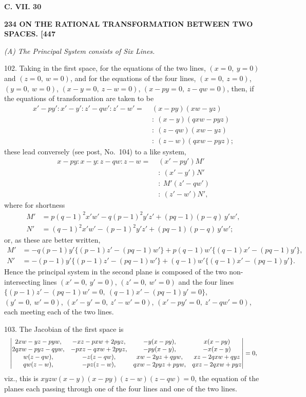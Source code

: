 \documentclass[11pt]{article}
\begin{document}
\medskip
\noindent\textbf{C. VII. \hfill 30}

\medskip
\noindent\textbf{234 \hfill ON THE RATIONAL TRANSFORMATION BETWEEN TWO SPACES. \hfill [447}

\medskip
\begin{center}\textit{(A) The Principal System consists of Six Lines.}\end{center}

102. Taking in the first space, for the equations of the two lines, $(x=0,\ y=0)$ and
$(z=0,\ w=0)$, and for the equations of the four lines, $(x=0,\ z=0)$, $(y=0,\ w=0)$,
$(x-y=0,\ z-w=0)$, $(x-py=0,\ z-qw=0)$, then, if the equations of transformation
are taken to be
\begin{align*}
x' - py' : x' - y' : z' - qw' : z' - w' = \;& (x - py)(xw - yz)\\
& :\ (x - y)(qxw - pyz)\\
& :\ (z - qw)(xw - yz)\\
& :\ (z - w)(qxw - pyz);
\end{align*}
these lead conversely (see post, No.~104) to a like system,
\begin{align*}
x - py : x - y : z - qw : z - w = \;& (x' - py')M'\\
& :\ (x' - y')N'\\
& :\ M'(z' - qw')\\
& :\ (z' - w')N',
\end{align*}
where for shortness
\begin{align*}
M' &= p(q-1)^2 x'w' - q(p-1)^2 y'z' + (pq-1)(p-q)\,y'w',\\
N' &= (q-1)^2 x'w' - (p-1)^2 y'z' + (pq-1)(p-q)\,y'w';
\end{align*}
or, as these are better written,
\begin{align*}
M' &= -q(p-1)y'\{(p-1)z' - (pq-1)w'\} + p(q-1)w'\{(q-1)x' - (pq-1)y'\},\\
N' &= -(p-1)y'\{(p-1)z' - (pq-1)w'\} + (q-1)w'\{(q-1)x' - (pq-1)y'\}.
\end{align*}
Hence the principal system in the second plane is composed of the two non-inter\-secting lines $(x'=0,\ y'=0)$, $(z'=0,\ w'=0)$ and the four lines
$\{(p-1)z' - (pq-1)w' = 0,\ (q-1)x' - (pq-1)y' = 0\}$, $(y'=0,\ w'=0)$, $(x'-y'=0,\ z'-w'=0)$, $(x'-py'=0,\ z'-qw'=0)$,
each meeting each of the two lines.

\medskip

103. The Jacobian of the first space is
\[ \resizebox{\textwidth}{!}{$\displaystyle \begin{vmatrix} 2xw - yz - pyw, & -xz - pxw + 2pyz, & -y(x-py), & x(x-py) \\ 2qxw - pyz - qyw, & -pxz - qxw + 2pyz, & -py(x-y), & -x(x-y) \\ w(z-qw), & -z(z-qw), & xw - 2yz + qyw, & xz - 2qxw + qyz \\ qw(z-w), & -pz(z-w), & qxw - 2pyz + pyw, & qxz - 2qxw + pyz \end{vmatrix} = 0,$} \]
viz., this is $xyzw(x-y)(x-py)(z-w)(z-qw) = 0$, the equation of the planes each
passing through one of the four lines and one of the two lines.
\end{document}
